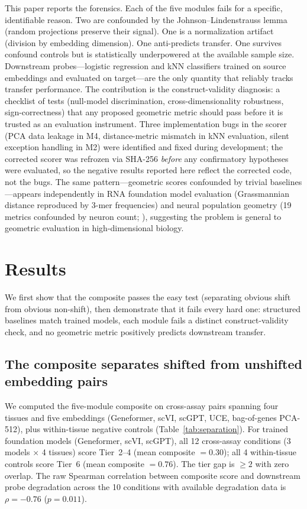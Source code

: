 \documentclass[9pt,lineno]{elife}
\begin{document}
This paper reports the forensics. Each of the five modules fails for a specific, identifiable reason. Two are confounded by the Johnson--Lindenstrauss lemma (random projections preserve their signal). One is a normalization artifact (division by embedding dimension). One anti-predicts transfer. One survives confound controls but is statistically underpowered at the available sample size. Downstream probes---logistic regression and kNN classifiers trained on source embeddings and evaluated on target---are the only quantity that reliably tracks transfer performance. The contribution is the construct-validity diagnosis: a checklist of tests (null-model discrimination, cross-dimensionality robustness, sign-correctness) that any proposed geometric metric should pass before it is trusted as an evaluation instrument. Three implementation bugs in the scorer (PCA data leakage in M4, distance-metric mismatch in kNN evaluation, silent exception handling in M2) were identified and fixed during development; the corrected scorer was refrozen via SHA-256 \emph{before} any confirmatory hypotheses were evaluated, so the negative results reported here reflect the corrected code, not the bugs. The same pattern---geometric scores confounded by trivial baselines---appears independently in RNA foundation model evaluation (Grassmannian distance reproduced by 3-mer frequencies) and neural population geometry (19 metrics confounded by neuron count; \citealp{tower2026bracket}), suggesting the problem is general to geometric evaluation in high-dimensional biology.


\section{Results}

We first show that the composite passes the easy test (separating obvious shift from obvious non-shift), then demonstrate that it fails every hard one: structured baselines match trained models, each module fails a distinct construct-validity check, and no geometric metric positively predicts downstream transfer.

\subsection{The composite separates shifted from unshifted embedding pairs}

We computed the five-module composite on cross-assay pairs spanning four tissues and five embeddings (Geneformer, scVI, scGPT, UCE, bag-of-genes PCA-512), plus within-tissue negative controls (Table~\ref{tab:separation}). For trained foundation models (Geneformer, scVI, scGPT), all 12 cross-assay conditions (3 models $\times$ 4 tissues) score Tier~2--4 (mean composite $= 0.30$); all 4 within-tissue controls score Tier~6 (mean composite $= 0.76$). The tier gap is $\geq 2$ with zero overlap. The raw Spearman correlation between composite score and downstream probe degradation across the 10 conditions with available degradation data is $\rho = -0.76$ ($p = 0.011$).
\end{document}
